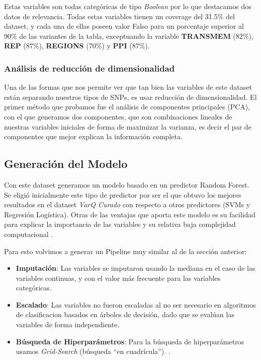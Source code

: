 Estas variables son todas categóricas de tipo \textit{Boolean} por lo que destacamos dos datos de relevancia. Todas estas variables tienen un coverage del 31.5\% del dataset, y cada una de ellas poseen valor Falso para un porcentaje superior al 90\% de las variantes de la tabla, exceptuando la variable \textbf{TRANSMEM} (82\%), \textbf{REP} (87\%), \textbf{REGIONS} (70\%) y \textbf{PPI} (87\%).

\subsubsection{Análisis de reducción de dimensionalidad}

Una de las formas que nos permite ver que tan bien las variables de este dataset están separando nuestros tipos de SNPs, es usar reducción de dimensionalidad. El primer método que probamos fue el análisis de componentes principales (PCA), con el que generamos dos componentes, que son combinaciones lineales de nuestras variables iniciales de forma de maximizar la varianza, es decir el par de componentes que mejor explican la información completa.


\newpage


\subsection{Generación del Modelo}

Con este dataset generamos un modelo basado en un predictor Random Forest. 
Se eligió inicialmente este tipo de predictor por ser el que obtuvo los mejores resultados en el dataset \textit{VarQ Curado}  con respecto a otros predictores (SVMs y Regresión Logística). Otras de las ventajas que aporta este modelo es su facilidad para explicar la importancia de las variables y su relativa baja complejidad computacional \todo{[Citar?]}. 

Para esto volvimos a generar un Pipeline muy similar al de la sección anterior:

\begin{itemize}
 
\item \textbf{Imputación}: Las variables se imputaron usando la mediana en el caso de las variables continuas, y con el valor más frecuente para las variables categóricas. 
\item \textbf{Escalado}: Las variables no fueron escaladas al no ser necesario en algoritmos de clasificacion basados en árboles de decisión, dado que se evalúan las variables de forma independiente. 
\item \textbf{Búsqueda de Hiperparámetros}: Para la búsqueda de hiperparámetros usamos \textit{Grid-Search} (búsqueda ``en cuadrícula''). .
\end{itemize}


